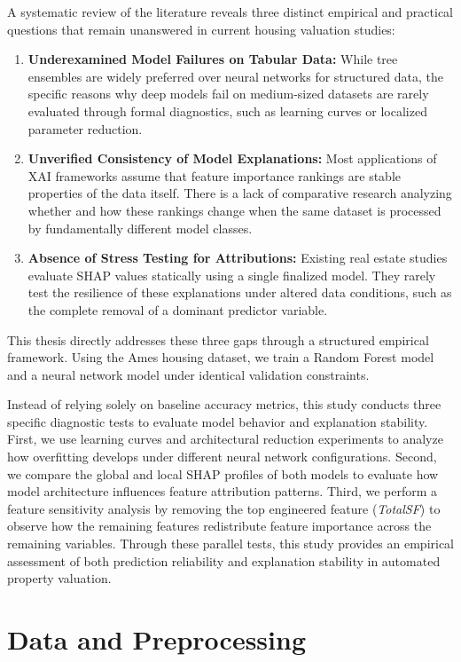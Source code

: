 \documentclass[12pt,a4paper,oneside,openany]{book}
\begin{document}
A systematic review of the literature reveals three distinct empirical and practical questions that remain unanswered in current housing valuation studies:
\begin{enumerate}
    \item \textbf{Underexamined Model Failures on Tabular Data:} While tree ensembles are widely preferred over neural networks for structured data, the specific reasons why deep models fail on medium-sized datasets are rarely evaluated through formal diagnostics, such as learning curves or localized parameter reduction.
    \item \textbf{Unverified Consistency of Model Explanations:} Most applications of XAI frameworks assume that feature importance rankings are stable properties of the data itself. There is a lack of comparative research analyzing whether and how these rankings change when the same dataset is processed by fundamentally different model classes.
\item \textbf{Absence of Stress Testing for Attributions:} Existing real estate studies evaluate SHAP values statically using a single finalized model. They rarely test the resilience of these explanations under altered data conditions, such as the complete removal of a dominant predictor variable.

\end{enumerate}

This thesis directly addresses these three gaps through a structured empirical framework. Using the Ames housing dataset, we train a Random Forest model and a neural network model under identical validation constraints.

Instead of relying solely on baseline accuracy metrics, this study conducts three specific diagnostic tests to evaluate model behavior and explanation stability. First, we use learning curves and architectural reduction experiments to analyze how overfitting develops under different neural network configurations. Second, we compare the global and local SHAP profiles of both models to evaluate how model architecture influences feature attribution patterns. Third, we perform a feature sensitivity analysis by removing the top engineered feature (\textit{TotalSF}) to observe how the remaining features redistribute feature importance across the remaining variables. Through these parallel tests, this study provides an empirical assessment of both prediction reliability and explanation stability in automated property valuation.


\chapter{Data and Preprocessing}
\end{document}
